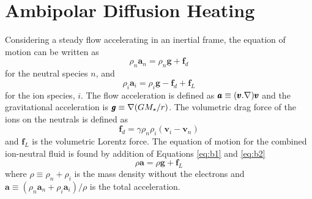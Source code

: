 
\chapter{Ambipolar Diffusion Heating}\label{app:2}

Considering a steady flow accelerating in an inertial frame, the equation of motion can be written as
\begin{equation}\label{eq:b1}
\rho _{n}\pmb{a}_{n} = \rho _{n}\pmb{g} + \pmb{f}_{d}
\end{equation}
for the neutral species $n$, and 
\begin{equation}\label{eq:b2}
\rho _{i}\pmb{a}_{i} = \rho _{i}\pmb{g} - \pmb{f}_{d} + \pmb{f} _{L}
\end{equation}
for the ion species, $i$. The flow acceleration is defined as $\pmb{a}\equiv (\pmb{v}.{\bf \nabla } )\pmb{v}$ and the gravitational acceleration is $\pmb{g} \equiv {\bf \nabla } (GM_{\star}/r)$. The volumetric drag force of the ions on the neutrals is defined as
\begin{equation}\label{eq:b3}
\pmb{f}_{d}=\gamma \rho _{n}\rho _{i}(\pmb{v}_{i}-\pmb{v}_{n})
\end{equation}
and $\pmb{f} _{L}$ is the volumetric Lorentz force. The equation of motion for the combined ion-neutral fluid is found by addition of Equations \ref{eq:b1} and \ref{eq:b2}
\begin{equation}
\rho \pmb{a} = \rho \pmb{g} +  \pmb{f} _{L}
\end{equation}
where $\rho \equiv \rho _{n} + \rho _{i}$ is the mass density without the electrons and $\pmb{a} \equiv (\rho _n\pmb{a}_{n} + \rho _{i}\pmb{a}_{i})/\rho$ is the total acceleration.

